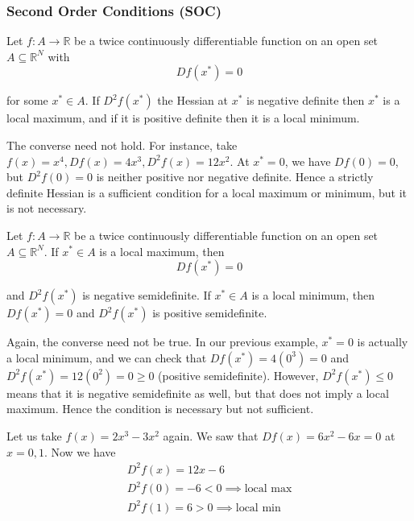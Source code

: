 \documentclass{article}
\begin{document}
\subsubsection{Second Order Conditions (SOC)}
\label{ssub:second_order_conditions_soc_}

\begin{theorem}
  Let $f: A \to \mathbb{R}$ be a twice continuously differentiable function on an open set $A \subseteq \mathbb{R}^N$ with
  \[
    D f(x^*) = 0
  \]

  for some $x^* \in A$. If $D^2 f(x^*)$ the Hessian at $x^*$ is negative definite then $x^*$ is a local maximum, and if it is positive definite then it is a local minimum.
\end{theorem}

\begin{remark}
  The converse need not hold. For instance, take $f(x) = x^4, Df(x) = 4x^3, D^2f(x) = 12x^2$. At $x^* = 0$, we have $Df(0) = 0$, but $D^2f(0) = 0$ is neither positive nor negative definite. Hence a strictly definite Hessian is a sufficient condition for a local maximum or minimum, but it is not necessary.
\end{remark}

\begin{theorem}
  Let $f: A \to \mathbb{R}$ be a twice continuously differentiable function on an open set $A \subseteq \mathbb{R}^N$. If $x^* \in A$ is a local maximum, then
  \[
    Df(x^*) = 0
  \]

  and $D^2f(x^*)$ is negative semidefinite. If $x^* \in A$ is a local minimum, then $Df(x^*) = 0$ and $D^2f(x^*)$ is positive semidefinite.
\end{theorem}

\begin{remark}
  Again, the converse need not be true. In our previous example, $x^* = 0$ is actually a local minimum, and we can check that $Df(x^*) = 4(0^3) = 0$ and $D^2f(x^*) = 12(0^2) = 0 \ge 0$ (positive semidefinite). However, $D^2f(x^*) \le 0$ means that it is negative semidefinite as well, but that does not imply a local maximum. Hence the condition is necessary but not sufficient.
\end{remark}

Let us take $f(x) = 2x^3 - 3x^2$ again. We saw that $Df(x) = 6x^2 - 6x = 0$ at $x = 0, 1$. Now we have
\begin{equation}
  \begin{array}{c}
    D^2f(x) = 12x - 6 \\
    D^2f(0) = - 6 < 0 \implies \text{local max} \\
    D^2f(1) = 6 > 0  \implies \text{local min}
  \end{array}
  \nonumber
\end{equation}
\end{document}
